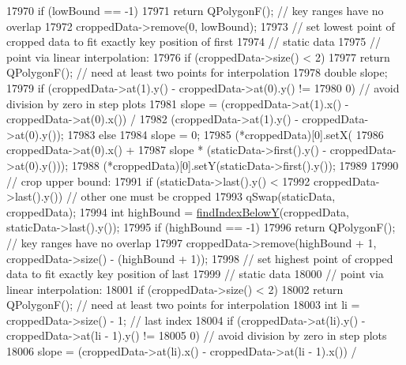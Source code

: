 \begin{DoxyCode}
17970     \textcolor{keywordflow}{if} (lowBound == -1)
17971       \textcolor{keywordflow}{return} QPolygonF(); \textcolor{comment}{// key ranges have no overlap}
17972     croppedData->remove(0, lowBound);
17973     \textcolor{comment}{// set lowest point of cropped data to fit exactly key position of first}
17974     \textcolor{comment}{// static data}
17975     \textcolor{comment}{// point via linear interpolation:}
17976     \textcolor{keywordflow}{if} (croppedData->size() < 2)
17977       \textcolor{keywordflow}{return} QPolygonF(); \textcolor{comment}{// need at least two points for interpolation}
17978     \textcolor{keywordtype}{double} slope;
17979     \textcolor{keywordflow}{if} (croppedData->at(1).y() - croppedData->at(0).y() !=
17980         0) \textcolor{comment}{// avoid division by zero in step plots}
17981       slope = (croppedData->at(1).x() - croppedData->at(0).x()) /
17982               (croppedData->at(1).y() - croppedData->at(0).y());
17983     \textcolor{keywordflow}{else}
17984       slope = 0;
17985     (*croppedData)[0].setX(
17986         croppedData->at(0).x() +
17987         slope * (staticData->first().y() - croppedData->at(0).y()));
17988     (*croppedData)[0].setY(staticData->first().y());
17989 
17990     \textcolor{comment}{// crop upper bound:}
17991     \textcolor{keywordflow}{if} (staticData->last().y() <
17992         croppedData->last().y()) \textcolor{comment}{// other one must be cropped}
17993       qSwap(staticData, croppedData);
17994     \textcolor{keywordtype}{int} highBound = \hyperlink{class_q_c_p_graph_a6c4d556de3d1e02f548401001f72c6ff}{findIndexBelowY}(croppedData, staticData->last().y());
17995     \textcolor{keywordflow}{if} (highBound == -1)
17996       \textcolor{keywordflow}{return} QPolygonF(); \textcolor{comment}{// key ranges have no overlap}
17997     croppedData->remove(highBound + 1, croppedData->size() - (highBound + 1));
17998     \textcolor{comment}{// set highest point of cropped data to fit exactly key position of last}
17999     \textcolor{comment}{// static data}
18000     \textcolor{comment}{// point via linear interpolation:}
18001     \textcolor{keywordflow}{if} (croppedData->size() < 2)
18002       \textcolor{keywordflow}{return} QPolygonF(); \textcolor{comment}{// need at least two points for interpolation}
18003     \textcolor{keywordtype}{int} li = croppedData->size() - 1; \textcolor{comment}{// last index}
18004     \textcolor{keywordflow}{if} (croppedData->at(li).y() - croppedData->at(li - 1).y() !=
18005         0) \textcolor{comment}{// avoid division by zero in step plots}
18006       slope = (croppedData->at(li).x() - croppedData->at(li - 1).x()) /

\end{DoxyCode}
